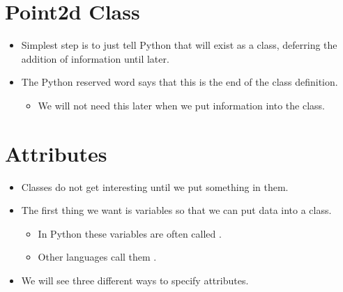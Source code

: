 \documentclass[letterpaper,10pt,english]{sphinxmanual}
\begin{document}
\section{Point2d Class}
\label{\detokenize{lecture_notes/lec18_classes1:point2d-class}}\begin{itemize}
\item {} 
Simplest step is to just tell Python that  will exist as a
class, deferring the addition of information until later.

%
\begin{sphinxVerbatim}[commandchars=\\\{\}]
 
\end{sphinxVerbatim}

\item {} 
The Python reserved word  says that this is the end of the
class definition.
\begin{itemize}
\item {} 
We will not need this later when we put information into the
class.

\end{itemize}

\end{itemize}


\section{Attributes}
\label{\detokenize{lecture_notes/lec18_classes1:attributes}}\begin{itemize}
\item {} 
Classes do not get interesting until we put something in them.

\item {} 
The first thing we want is variables so that we can put data into a
class.
\begin{itemize}
\item {} 
In Python these variables are often called .

\item {} 
Other languages call them .

\end{itemize}

\item {} 
We will see three different ways to specify attributes.

\end{itemize}
\end{document}
